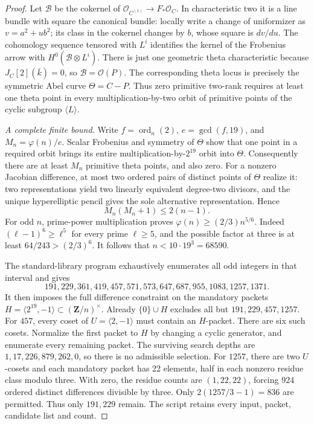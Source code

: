 \documentclass[11pt,a4paper]{article}
\begin{document}
\begin{proof}
Let $\mathcal B$ be the cokernel of
$\mathcal O_{C^{(1)}}\to F_*\mathcal O_C$. In characteristic two it
is a line bundle with square the canonical bundle: locally write
a change of uniformizer as $v=a^2+u b^2$; its class in the
cokernel changes by $b$, whose square is $dv/du$. The cohomology
sequence tensored with $L^i$ identifies the kernel of the
Frobenius arrow with $H^0(\mathcal B\otimes L^i)$.
There is just one geometric theta characteristic because
$J_C[2](\bar k)=0$, so $\mathcal B=\mathcal O(P)$.
The corresponding theta locus is precisely the symmetric Abel
curve $\Theta=C-P$. Thus zero primitive two-rank requires at
least one theta point in every multiplication-by-two orbit of
primitive points of the cyclic subgroup $\langle L\rangle$.

\emph{A complete finite bound.}
Write $f=\operatorname{ord}_n(2)$,
$e=\gcd(f,19)$, and $M_n=\varphi(n)/e$.
Scalar Frobenius and symmetry of $\Theta$ show that one point
in a required orbit brings its entire multiplication-by-$2^{19}$
orbit into $\Theta$. Consequently there are at least $M_n$
primitive theta points, and also zero. For a nonzero Jacobian
difference, at most two ordered pairs of distinct points of
$\Theta$ realize it: two representations yield two linearly
equivalent degree-two divisors, and the unique hyperelliptic
pencil gives the sole alternative representation. Hence
\[
 M_n(M_n+1)\le2(n-1).
\]
For odd $n$, prime-power multiplication proves
$\varphi(n)\ge(2/3)n^{5/6}$. Indeed
$(\ell-1)^6\ge\ell^5$ for every prime $\ell\ge5$, and the possible
factor at three is at least $64/243>(2/3)^6$.
It follows that $n<10\cdot19^3=68590$.

The standard-library program 
exhaustively enumerates all odd integers in that interval and gives
\[
191,229,361,419,457,571,573,647,687,955,1083,1257,1371.
\]
It then imposes the full difference constraint on the mandatory
packets $H=\langle 2^{19},-1\rangle\subset(\mathbf Z/n)^\times$.
Already $\{0\}\cup H$ excludes all but $191,229,457,1257$.
For $457$, every coset of $U=\langle2,-1\rangle$ must contain an
$H$-packet. There are six such cosets. Normalize the first packet
to $H$ by changing a cyclic generator, and enumerate every
remaining packet. The surviving search depths are
$1,17,226,879,262,0$, so there is no admissible selection.
For $1257$, there are two $U$-cosets and each mandatory packet
has 22 elements, half in each nonzero residue class modulo three.
With zero, the residue counts are $(1,22,22)$, forcing
$924$ ordered distinct differences divisible by three. Only
$2(1257/3-1)=836$ are permitted. Thus only $191,229$ remain.
The script retains every input, packet, candidate list and count.


\end{proof}
\end{document}
